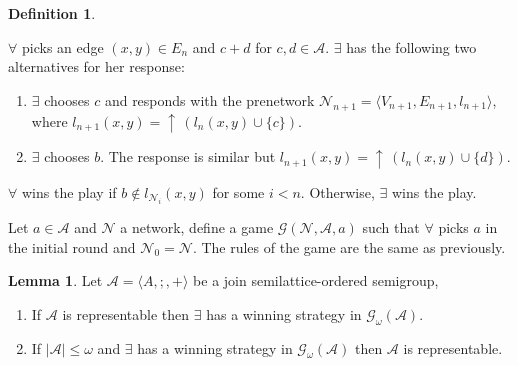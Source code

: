 \documentclass[a4paper]{article}
\theoremstyle{definition}
\newtheorem{definition}{Definition}
\theoremstyle{theorem}
\theoremstyle{proposition}
\theoremstyle{lemma}
\newtheorem{lemma}{Lemma}
\theoremstyle{ex}
\theoremstyle{corollary}
\theoremstyle{claim}
\newcommand{\up}[1]{\ensuremath{{\uparrow}\,#1}}
\begin{document}
\begin{definition}
\begin{enumerate}
\begin{enumerate}
      $\forall$ picks an edge $(x, y) \in E_n$ and $c + d$ for $c, d \in \mathcal{A}$. $\exists$ has the following two alternatives for her response:
      \begin{enumerate}
        \item $\exists$ chooses $c$ and responds with the prenetwork $\mathcal{N}_{n + 1} = \langle V_{n + 1}, E_{n + 1}, l_{n + 1} \rangle$, where $l_{n+1}(x, y) = \up{(l_n(x,y) \cup \{ c \})}$.
        \item $\exists$ chooses $b$. The response is similar but $l_{n + 1}(x, y) = \up{(l_n(x,y) \cup \{ d \})}$.
      \end{enumerate}
    \end{enumerate}
  \end{enumerate}

  $\forall$ wins the play if $b \notin l_{\mathcal{N}_i}(x,y)$ for some $i < n$. Otherwise, $\exists$ wins the play.

  Let $a \in \mathcal{A}$ and $\mathcal{N}$ a network, define a game $\mathcal{G}(\mathcal{N}, \mathcal{A}, a)$ such that $\forall$ picks $a$ in the initial round and $\mathcal{N}_0 = \mathcal{N}$. The rules of the game are the same as previously.
\end{definition}

\begin{lemma} \label{rep} Let $\mathcal{A} = \langle A, ;, + \rangle$ be a join semilattice-ordered semigroup,

  \begin{enumerate}
    \item If $\mathcal{A}$ is representable then $\exists$ has a winning strategy in $\mathcal{G}_{\omega}(\mathcal{A})$.
    \item If $|\mathcal{A}| \leq \omega$ and $\exists$ has a winning strategy in $\mathcal{G}_{\omega}(\mathcal{A})$ then $\mathcal{A}$ is representable.
  \end{enumerate}
\end{lemma}
\end{document}
